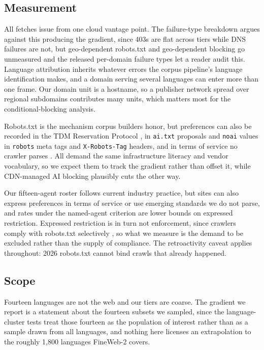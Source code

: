 \documentclass[11pt]{article}
\begin{document}
\subsection{Measurement}

All fetches issue from one cloud vantage point. The failure-type breakdown argues against this producing the gradient, since 403s are flat across tiers while DNS failures are not, but geo-dependent robots.txt and geo-dependent blocking go unmeasured and the released per-domain failure types let a reader audit this. Language attribution inherits whatever errors the corpus pipeline's language identification makes, and a domain serving several languages can enter more than one frame. Our domain unit is a hostname, so a publisher network spread over regional subdomains contributes many units, which matters most for the conditional-blocking analysis.

Robots.txt is the mechanism corpus builders honor, but preferences can also be recorded in the TDM Reservation Protocol \citep{tdmrep2024}, in \texttt{ai.txt} proposals and \texttt{noai} values in \texttt{robots} meta tags and \texttt{X-Robots-Tag} headers, and in terms of service no crawler parses \citep{longpre2024consent}. All demand the same infrastructure literacy and vendor vocabulary, so we expect them to track the gradient rather than offset it, while CDN-managed AI blocking plausibly cuts the other way.

Our fifteen-agent roster follows current industry practice, but sites can also express preferences in terms of service or use emerging standards we do not parse, and rates under the named-agent criterion are lower bounds on expressed restriction. Expressed restriction is in turn not enforcement, since crawlers comply with robots.txt selectively \citep{kim2025scrapers,liu2024somesite}, so what we measure is the demand to be excluded rather than the supply of compliance. The retroactivity caveat applies throughout: 2026 robots.txt cannot bind crawls that already happened.

\subsection{Scope}

Fourteen languages are not the web and our tiers are coarse. The gradient we report is a statement about the fourteen subsets we sampled, since the language-cluster tests treat those fourteen as the population of interest rather than as a sample drawn from all languages, and nothing here licenses an extrapolation to the roughly 1,800 languages FineWeb-2 covers.
\end{document}
